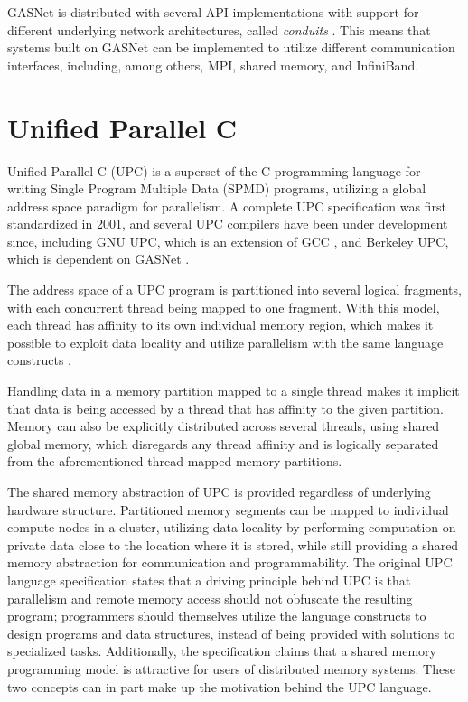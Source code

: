 \documentclass{uit-report}
\begin{document}
GASNet is distributed with several API implementations with support for different underlying network architectures, called \emph{conduits} \cite{gasnetreadme}. This means that systems built on GASNet can be implemented to utilize different communication interfaces, including, among others, MPI, shared memory, and InfiniBand.

\section{Unified Parallel C}
Unified Parallel C (UPC) is a superset of the C programming language for writing Single Program Multiple Data (SPMD) programs, utilizing a global address space paradigm for parallelism. A complete UPC specification was first standardized in 2001, and several UPC compilers have been under development since, including GNU UPC, which is an extension of GCC \cite{web_gnu_upc}, and Berkeley UPC, which is dependent on GASNet \cite{web_berkeley_upc}.

The address space of a UPC program is partitioned into several logical fragments, with each concurrent thread being mapped to one fragment. With this model, each thread has affinity to its own individual memory region, which makes it possible to exploit data locality and utilize parallelism with the same language constructs \cite{evaluation_of_upc}.

Handling data in a memory partition mapped to a single thread makes it implicit that data is being accessed by a thread that has affinity to the given partition. Memory can also be explicitly distributed across several threads, using shared global memory, which disregards any thread affinity and is logically separated from the aforementioned thread-mapped memory partitions.

The shared memory abstraction of UPC is provided regardless of underlying hardware structure. Partitioned memory segments can be mapped to individual compute nodes in a cluster, utilizing data locality by performing computation on private data close to the location where it is stored, while still providing a shared memory abstraction for communication and programmability. The original UPC language specification \cite{upc_language_specification} states that a driving principle behind UPC is that parallelism and remote memory access should not obfuscate the resulting program; programmers should themselves utilize the language constructs to design programs and data structures, instead of being provided with solutions to specialized tasks. Additionally, the specification claims that a shared memory programming model is attractive for users of distributed memory systems. These two concepts can in part make up the motivation behind the UPC language.
\end{document}
